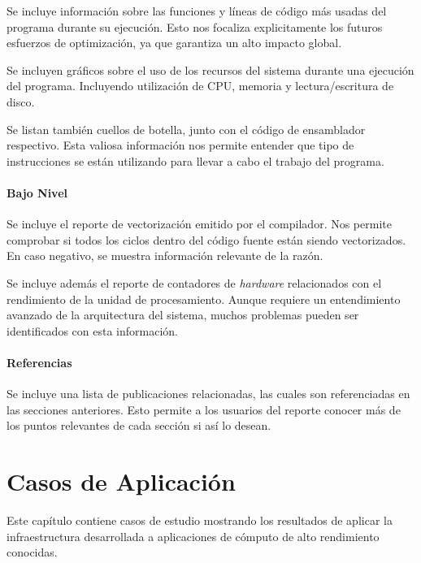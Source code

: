 \documentclass[a4paper]{report}
\begin{document}
Se incluye información sobre las funciones y líneas de código más usadas del programa durante su ejecución. Esto nos focaliza explicitamente los futuros esfuerzos de optimización, ya que garantiza un alto impacto global.

\bigskip

Se incluyen gráficos sobre el uso de los recursos del sistema durante una ejecución del programa. Incluyendo utilización de CPU, memoria y lectura/escritura de disco.

\bigskip

Se listan también cuellos de botella, junto con el código de ensamblador respectivo. Esta valiosa información nos permite entender que tipo de instrucciones se están utilizando para llevar a cabo el trabajo del programa.

\subsubsection{Bajo Nivel}

Se incluye el reporte de vectorización emitido por el compilador. Nos permite comprobar si todos los ciclos dentro del código fuente están siendo vectorizados. En caso negativo, se muestra información relevante de la razón.

\bigskip

Se incluye además el reporte de contadores de {\it hardware} relacionados con el rendimiento de la unidad de procesamiento. Aunque requiere un entendimiento avanzado de la arquitectura del sistema, muchos problemas pueden ser identificados con esta información.

\subsubsection{Referencias}

Se incluye una lista de publicaciones relacionadas, las cuales son referenciadas en las secciones anteriores.
Esto permite a los usuarios del reporte conocer más de los puntos relevantes de cada sección si así lo desean.

\chapter{Casos de Aplicación} \label{Casos de Aplicacion}

Este capítulo contiene casos de estudio mostrando los resultados de aplicar la infraestructura desarrollada a aplicaciones de cómputo de alto rendimiento conocidas.
\end{document}

